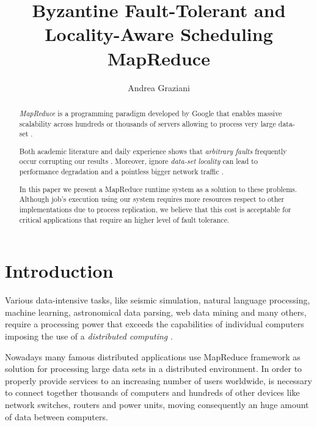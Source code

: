 \documentclass[sigchi]{acmart}
\begin{document}
\title{Byzantine Fault-Tolerant and Locality-Aware Scheduling MapReduce}

\author{Andrea Graziani}

\renewcommand{\shortauthors}{Andrea Graziani (0273395)}





\begin{abstract}
\textit{MapReduce} is a programming paradigm developed by Google that enables massive scalability across hundreds or thousands of servers allowing to process very large data-set \cite{IBMWhatIsMapReduce}.

Both academic literature and daily experience shows that \textit{arbitrary faults} frequently occur corrupting our results \cite{BFLMapReduce}. Moreover, ignore \textit{data-set locality} can lead to performance degradation and a pointless bigger network traffic \cite{LARTS}.

In this paper we present a MapReduce runtime system as a solution to these problems. Although job's execution using our system requires more resources respect to other implementations due to process replication, we believe that this cost is acceptable for critical applications that require an higher level of fault tolerance.
\end{abstract}

\maketitle

\section{Introduction}

Various data-intensive tasks, like seismic simulation, natural language processing, machine learning, astronomical data parsing, web data mining and many others, require a processing power that exceeds the capabilities of individual computers imposing the use of a \textit{distributed computing} \cite{LARTS}.

Nowadays many famous distributed applications use MapReduce framework as solution for processing large data sets in a distributed environment. In order to properly provide services to an increasing number of users worldwide, is necessary to connect together thousands of computers and hundreds of other devices like network switches, routers and power units, moving consequently an huge amount of data between computers. 
\end{document}
